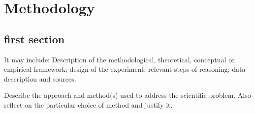 \chapter{Methodology} \label{ch:method}


\section{first section} \label{sec:sectionlabel}

It may include: Description of the methodological, theoretical, conceptual or empirical framework; design of the
experiment; relevant steps of reasoning; data description and sources.

Describe the approach and method(s) used to address the scientific problem. Also reflect on the particular choice of method and justify it.